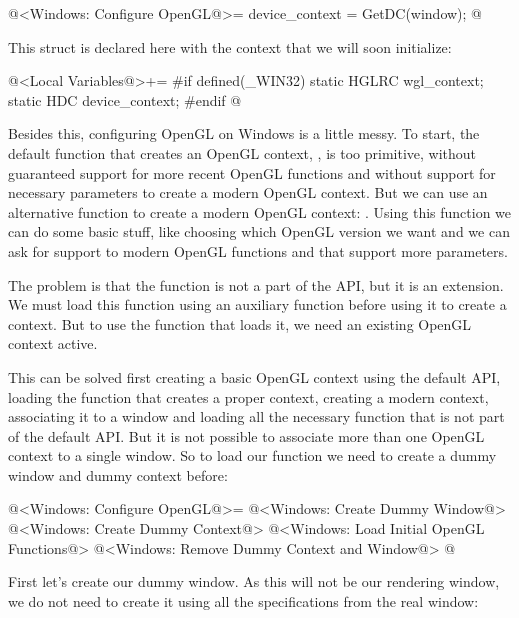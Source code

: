 \iniciocodigo
@<Windows: Configure OpenGL@>=
device_context = GetDC(window);
@
\fimcodigo

This struct is declared here with the context that we will soon initialize:

\iniciocodigo
@<Local Variables@>+=
#if defined(_WIN32)
static HGLRC wgl_context;
static HDC device_context;
#endif
@
\fimcodigo

Besides this, configuring OpenGL on Windows is a little messy. To
start, the default function that creates an OpenGL
context, , is too primitive, without
guaranteed support for more recent OpenGL functions and without
support for necessary parameters to create a modern OpenGL
context. But we can use an alternative function to create a modern
OpenGL context: . Using this
function we can do some basic stuff, like choosing which OpenGL
version we want and we can ask for support to modern OpenGL functions
and that support more parameters.

The problem is that the
function  is not a part of the
API, but it is an extension. We must load this function using an
auxiliary function before using it to create a context. But to use the
function that loads it, we need an existing OpenGL context active.

This can be solved first creating a basic OpenGL context using the
default API, loading the function that creates a proper context,
creating a modern context, associating it to a window and loading all
the necessary function that is not part of the default API. But it is
not possible to associate more than one OpenGL context to a single
window. So to load our function we need to create a dummy window and
dummy context before:

\iniciocodigo
@<Windows: Configure OpenGL@>=
{
@<Windows: Create Dummy Window@>
@<Windows: Create Dummy Context@>
@<Windows: Load Initial OpenGL Functions@>
@<Windows: Remove Dummy Context and Window@>
}
@
\fimcodigo

First let's create our dummy window. As this will not be our rendering
window, we do not need to create it using all the specifications from
the real window:

